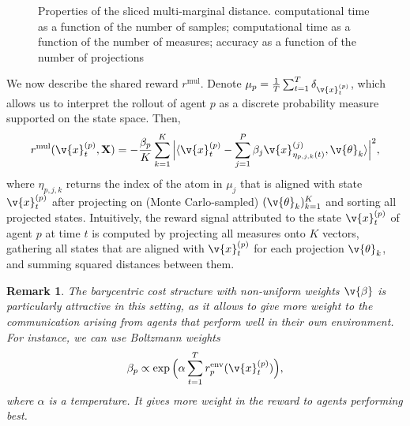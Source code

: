 \documentclass{article}
\newtheorem*{remark}{Remark}
\begin{document}
\begin{figure*}
%
\hfill
{}%
\hfill
{}
\caption{Properties of the sliced multi-marginal distance.  computational time as a function of the number of samples;  computational time as a function of the number of measures;  accuracy as a function of the number of projections}
\label{fig:analysis}
\end{figure*}



We now describe the shared reward $r^{\text{mul}}$. Denote $\mu_p = \frac{1}{T}\sum_{t=1}^T\delta_{\v{x}_t^{(p)}}$, which allows us to interpret the rollout of agent $p$ as a discrete probability measure supported on the state space. Then,
\[
 r^{\text{mul}}(\v{x}^{(p)}_t, \m{X})= - \frac{\beta_p}{K}\sum_{k=1}^K\Big|\langle \v{x}_t^{(p)}- \sum_{j=1}^P\beta_j \v{x}_{\eta_{p,j,k}(t)}^{(j)}, \v{\theta}_k\rangle \Big|^2,
\]
where $\eta_{p,j,k}$ returns the index of the atom in $\mu_j$ that is aligned with state $\v{x}_t^{(p)}$ after projecting on (Monte Carlo-sampled) $(\v{\theta}_k)_{k=1}^K$ and sorting all projected states. Intuitively, the reward signal attributed to the state $\v{x}^{(p)}_t$ of agent $p$ at time $t$ is computed by projecting all measures onto $K$ vectors, gathering all states that are aligned with $\v{x}^{(p)}_t$ for each projection $\v{\theta}_k$, and summing squared distances between them. 


\begin{remark}
The barycentric cost structure with non-uniform  weights $\v{\beta}$ is particularly attractive in this setting, as it allows to give more weight to the communication arising from agents that perform well in their own environment. For instance, we can use Boltzmann weights 
\[
\beta_p\propto \exp\Big(\alpha\sum_{t=1}^{T}r_p^{\text{env}}(\v{x}^{(p)}_{t})\Big),
\]
where $\alpha$ is a temperature. It gives more weight in the  reward to agents performing best.
\end{remark}
\end{document}
